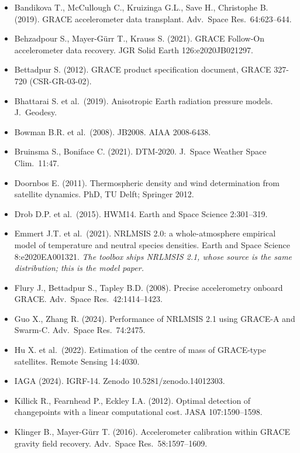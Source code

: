 \small
\begin{itemize}[nosep,leftmargin=*]
\item Bandikova T., McCullough C., Kruizinga G.L., Save H., Christophe B. (2019). GRACE accelerometer data transplant. Adv.\ Space Res.\ 64:623--644.
\item Behzadpour S., Mayer-Gürr T., Krauss S. (2021). GRACE Follow-On accelerometer data recovery. JGR Solid Earth 126:e2020JB021297.
\item Bettadpur S. (2012). GRACE product specification document, GRACE 327-720 (CSR-GR-03-02).
\item Bhattarai S. et al.\ (2019). Anisotropic Earth radiation pressure models. J.\ Geodesy.
\item Bowman B.R. et al.\ (2008). JB2008. AIAA 2008-6438.
\item Bruinsma S., Boniface C. (2021). DTM-2020. J.\ Space Weather Space Clim.\ 11:47.
\item Doornbos E. (2011). Thermospheric density and wind determination from satellite dynamics. PhD, TU Delft; Springer 2012.
\item Drob D.P. et al.\ (2015). HWM14. Earth and Space Science 2:301--319.
\item Emmert J.T. et al.\ (2021). NRLMSIS 2.0: a whole-atmosphere empirical model of temperature and neutral species densities. Earth and Space Science 8:e2020EA001321. \emph{The toolbox ships NRLMSIS 2.1, whose source is the same distribution; this is the model paper.}
\item Flury J., Bettadpur S., Tapley B.D. (2008). Precise accelerometry onboard GRACE. Adv.\ Space Res.\ 42:1414--1423.
\item Guo X., Zhang R. (2024). Performance of NRLMSIS 2.1 using GRACE-A and Swarm-C. Adv.\ Space Res.\ 74:2475.
\item Hu X. et al.\ (2022). Estimation of the centre of mass of GRACE-type satellites. Remote Sensing 14:4030.
\item IAGA (2024). IGRF-14. Zenodo 10.5281/zenodo.14012303.
\item Killick R., Fearnhead P., Eckley I.A. (2012). Optimal detection of changepoints with a linear computational cost. JASA 107:1590--1598.
\item Klinger B., Mayer-Gürr T. (2016). Accelerometer calibration within GRACE gravity field recovery. Adv.\ Space Res.\ 58:1597--1609.

\end{itemize}
